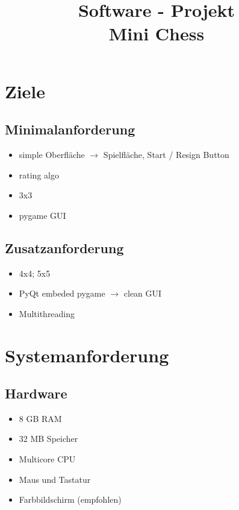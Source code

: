 \documentclass{article}
\title{\textbf{Software - Projekt\\Mini Chess}}
\date{\vspace{-5ex}}
\begin{document}
\maketitle
\thispagestyle{fancy}


\tableofcontents
\newpage


\section{Ziele}\label{section-goals}

\subsection{Minimalanforderung}
\begin{itemize}
    \item simple Oberfläche $\rightarrow$ Spielfläche, Start / Resign Button
    \item rating algo
    \item 3x3
    \item pygame GUI
\end{itemize}

\subsection{Zusatzanforderung}
\begin{itemize}
    \item 4x4; 5x5
    \item PyQt embeded pygame $\rightarrow$ clean GUI
    \item Multithreading
\end{itemize}


\newpage
\section{Systemanforderung}\label{section-requirements}

\subsection{Hardware}
\begin{itemize}
    \item 8 GB RAM
    \item 32 MB Speicher
    \item Multicore CPU
    \item Maus und Tastatur
    \item Farbbildschirm (empfohlen)
\end{itemize}
\end{document}
